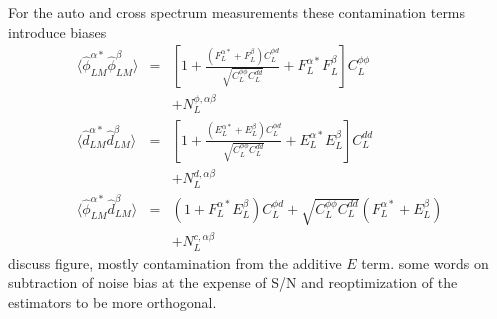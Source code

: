 \documentclass[prd,amsmath,amssymb,floatfix,superscriptaddress,nofootinbib,twocolumn]{revtex4-1}
\def\bea{\begin{eqnarray}}
\def\eea{\end{eqnarray}}
\newcommand{\ec}[1]{Eq.~(\ref{eq:#1})}
\newcommand{\peikai}[1]{{\color{blue} #1}}
\newcommand{\wh}[1]{{\color{red} #1}}
\begin{document}
 For the auto and cross spectrum measurements these contamination terms introduce biases \bea
  \langle \hat{\phi}^{\alpha*}_{LM}\hat{\phi}^{\beta}_{LM} \rangle &=&
  \left[ 1 +\frac{(F_L^{\alpha*}+F_L^{\beta} )C_L^{\phi d}}{\sqrt{C_L^{\phi\phi} C_L^{dd} }}
  + F_L^{\alpha*}F_L^{\beta} \right] C_L^{\phi\phi} 
  \nonumber\\
  &&+ N_L^{\phi,\alpha\beta} \nonumber\\
    \langle \hat{d}^{\alpha*}_{LM}\hat{d}^{\beta}_{LM} \rangle &=&
  \left[ 1 +\frac{(E_L^{\alpha*}+E_L^{\beta} )C_L^{\phi d}}{\sqrt{C_L^{\phi\phi} C_L^{dd} }}
  + E_L^{\alpha*}E_L^{\beta} \right] C_L^{dd} 
  \nonumber\\
  &&+ N_L^{d,\alpha\beta} \nonumber\\
 \langle \hat{\phi}^{\alpha*}_{LM}\hat{d}^{\beta}_{LM} \rangle&=& (1+ F_L^{\alpha *} E_L^{\beta}){C}_{L}^{\phi d}+ \sqrt{C_{L}^{\phi\phi} C_{L}^{dd}} ( F_L^{\alpha*} + E_L^{\beta}) \nonumber\\
&&  +N_{L}^{c,\alpha\beta} 
\eea
 \wh{discuss figure, mostly contamination from the additive $E$ term.  some words on subtraction of noise bias at the expense of S/N and reoptimization of the estimators to be 
 more orthogonal.}
\end{document}
